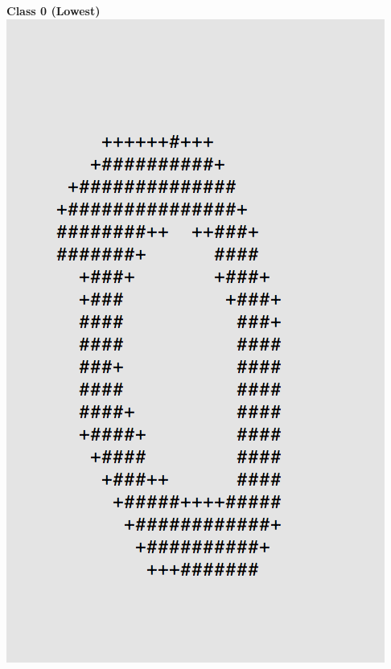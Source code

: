 \documentclass[11pt]{article}
\begin{document}
\begin{center}
\begin{multicols}{2}
\textbf{Class 0 (Lowest)}\\
\includegraphics[scale=0.4]{part1/1/low_0.png}
\end{multicols}
\end{center}
\end{document}

